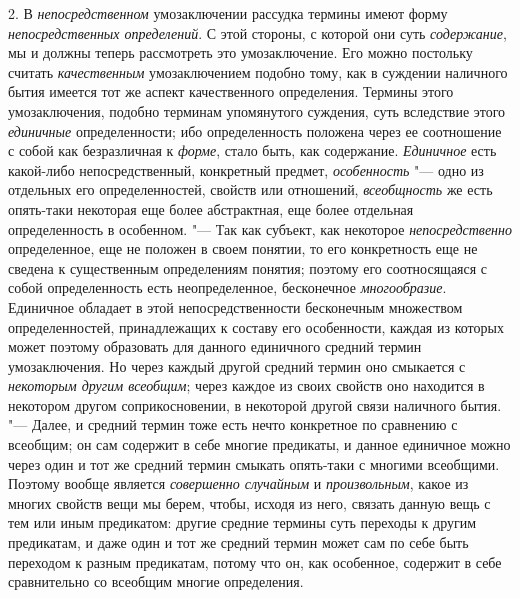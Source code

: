 {{2. В
{\em непосредственном}
умозаключении рассудка термины имеют форму
{\em непосредственных определений}.
С этой стороны, с которой они суть
{\em содержание}, мы и
должны теперь рассмотреть это умозаключение. Его можно постольку считать
{\em качественным}
умозаключением подобно тому, как в суждении наличного бытия
имеется тот же аспект качественного определения. Термины этого
умозаключения, подобно терминам упомянутого суждения, суть вследствие этого
{\em единичные}
определенности; ибо определенность положена через ее
соотношение с собой как безразличная к
{\em форме}, стало быть,
как содержание. {\em Единичное}
есть какой-либо непосредственный, конкретный предмет,
{\em особенность} "--- одно
из отдельных его определенностей, свойств или отношений,
{\em всеобщность} же есть
опять-таки некоторая еще более абстрактная, еще более отдельная
определенность в особенном. "--- Так как субъект, как некоторое
{\em непосредственно}
определенное, еще не положен в своем понятии, то его
конкретность еще не сведена к существенным определениям понятия; поэтому
его соотносящаяся с собой определенность есть
неопределенное, бесконечное
{\em многообразие}.
Единичное обладает в этой непосредственности бесконечным
множеством определенностей, принадлежащих к составу его особенности, каждая
из которых может поэтому образовать для данного единичного средний термин
умозаключения. Но через каждый другой средний термин оно смыкается с
{\em некоторым другим всеобщим};
через каждое из своих свойств оно находится в некотором
другом соприкосновении, в некоторой другой связи наличного бытия. "---
Далее, и средний термин тоже есть нечто конкретное по
сравнению с всеобщим; он сам содержит в себе многие предикаты, и данное
единичное можно через один и тот же средний термин смыкать опять-таки с
многими всеобщими. Поэтому вообще является
{\em совершенно случайным}
и {\em произвольным},
какое из многих свойств вещи мы берем, чтобы, исходя из него,
связать данную вещь с тем или иным предикатом: другие средние термины суть
переходы к другим предикатам, и даже один и тот же средний термин может сам
по себе быть переходом к разным предикатам, потому что он, как особенное,
содержит в себе сравнительно со всеобщим многие определения.

}}
